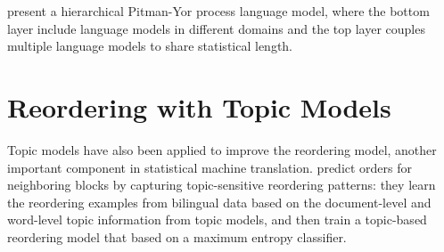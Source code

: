 \citet{wood-09} present a hierarchical Pitman-Yor process language model, where the bottom layer include language models in different domains and the top layer couples multiple language models to share statistical length.

\section{Reordering with Topic Models}

Topic models have also been applied to improve the reordering model, another important component in statistical machine translation.
\citet{wang-14} predict orders for neighboring blocks by capturing topic-sensitive reordering patterns: they learn the reordering examples from bilingual data based on the document-level and word-level topic information from topic models, and then train a topic-based reordering model that based on a maximum entropy classifier. 


